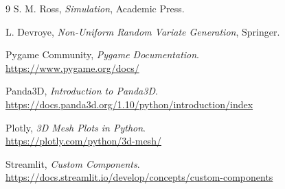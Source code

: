 \documentclass[12pt,a4paper]{article}
\begin{document}
\begin{thebibliography}{9}
S. M. Ross, \textit{Simulation}, Academic Press.

L. Devroye, \textit{Non-Uniform Random Variate Generation}, Springer.

Pygame Community, \textit{Pygame Documentation}.\\
\url{https://www.pygame.org/docs/}

Panda3D, \textit{Introduction to Panda3D}.\\
\url{https://docs.panda3d.org/1.10/python/introduction/index}

Plotly, \textit{3D Mesh Plots in Python}.\\
\url{https://plotly.com/python/3d-mesh/}

Streamlit, \textit{Custom Components}.\\
\url{https://docs.streamlit.io/develop/concepts/custom-components}
\end{thebibliography}
\end{document}
